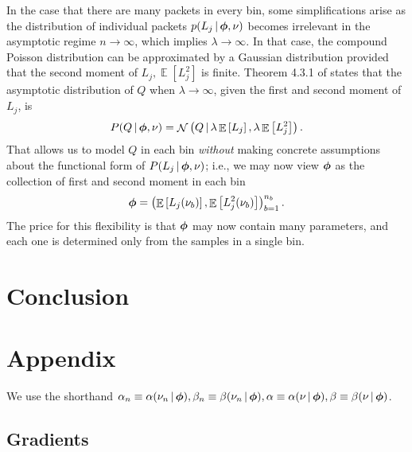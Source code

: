 \documentclass[11pt]{article}
\newcommand{\cond}{\,|\,}
\DeclareMathOperator{\Expect}{\mathbb{E}}
\newcommand{\expect}[1]{\Expect\left[#1\right]}
\DeclareMathOperator{\GaussianDist}{\mathcal{N}}
\newcommand{\Lumtot}{Q}
\newcommand{\Lum}{L}
\begin{document}
In the case that there are many packets in every bin, some
simplifications arise as the distribution of individual packets
$p(\Lum_j \cond \bmphi, \nu)$ becomes irrelevant in the asymptotic regime
$n \to \infty$, which implies $\lambda \to \infty$. In that case, the
compound Poisson distribution can be approximated by a Gaussian
distribution provided that the second moment of $\Lum_j, \expect{\Lum_j^2}$
is finite. Theorem 4.3.1 of \cite{bening2002generalized} states
that
the asymptotic distribution of $\Lumtot$ when $\lambda \to \infty$, given
the first and second moment of $\Lum_j$, is
\begin{align}
  \label{eq:asympt-normal}
  P(\Lumtot \cond \bmphi, \nu) = \GaussianDist \left( \Lumtot \cond \lambda \expect{\Lum_j}, \lambda \expect{\Lum_j^2} \right).
\end{align}
That allows us to model $\Lumtot$ in each bin \emph{without} making concrete
assumptions about the functional form of $P(\Lum_j \cond \bmphi, \nu)$; i.e., we may now view ${\bm{\phi}}$ as the collection of first and second moment in each bin
\begin{align}
  \label{eq:phi-bin-moments}
  \bmphi = \left(\expect{\Lum_j(\nu_b)}, \expect{\Lum_j^2(\nu_b)} \right)_{b=1}^{n_b}.
\end{align}
The price for this flexibility is that ${\bm{\phi}}$ may now contain many
parameters, and each one is determined only from the samples in a
single bin.

\section{Conclusion} \label{sec:conclusion}

\section{Appendix} \label{sec:appendix}

We use the shorthand $\alpha_n \equiv \alpha(\nu_n \cond
\bmphi), \beta_n \equiv \beta(\nu_n \cond \bmphi), \alpha \equiv
\alpha(\nu \cond \bmphi), \beta \equiv \beta(\nu \cond \bmphi)$.

\subsection{Gradients} \label{sec:gradients}
\end{document}
